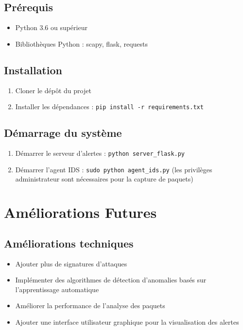 \documentclass[12pt,a4paper]{article}
\begin{document}
\subsection{Prérequis}
\begin{itemize}
    \item Python 3.6 ou supérieur
    \item Bibliothèques Python : scapy, flask, requests
\end{itemize}

\subsection{Installation}
\begin{enumerate}
    \item Cloner le dépôt du projet
    \item Installer les dépendances : \texttt{pip install -r requirements.txt}
\end{enumerate}

\subsection{Démarrage du système}
\begin{enumerate}
    \item Démarrer le serveur d'alertes : \texttt{python server\_flask.py}
    \item Démarrer l'agent IDS : \texttt{sudo python agent\_ids.py} (les privilèges administrateur sont nécessaires pour la capture de paquets)
\end{enumerate}

\section{Améliorations Futures}

\subsection{Améliorations techniques}
\begin{itemize}
    \item Ajouter plus de signatures d'attaques
    \item Implémenter des algorithmes de détection d'anomalies basés sur l'apprentissage automatique
    \item Améliorer la performance de l'analyse des paquets
    \item Ajouter une interface utilisateur graphique pour la visualisation des alertes
\end{itemize}
\end{document}
